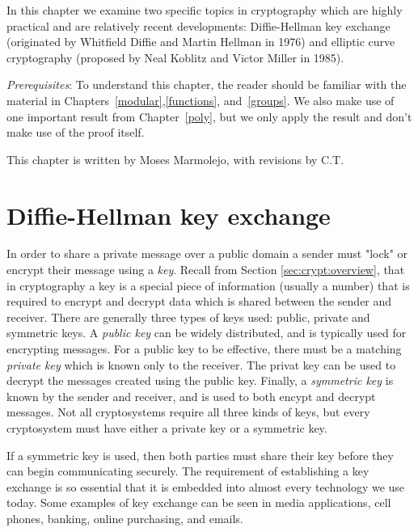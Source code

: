 
In this chapter we examine two specific topics in cryptography which are highly practical and are relatively recent developments: Diffie-Hellman key exchange (originated by Whitfield Diffie and Martin Hellman in 1976) and elliptic curve cryptography (proposed by Neal Koblitz and Victor Miller in 1985).
\medskip

\noindent
\emph{Prerequisites}: 
To understand this chapter, the reader should be familiar with the material in  Chapters~\ref{modular},\ref{functions}, and~\ref{groups}. We also make use of one important result from Chapter~\ref{poly}, but we only apply the result and don't make use of the proof itself.  
\bigskip

This chapter is written by Moses Marmolejo, with revisions by C.T.

\section{Diffie-Hellman key exchange}\label{sec:DHKE:1}

In order to share a private message over a public domain a sender must  "lock" or encrypt their message using a \emph{key}.  Recall from Section \ref{sec:crypt:overview}, that in cryptography a  key is a special piece of information (usually a number)  that is required to encrypt and decrypt data which is shared between the sender and receiver. There are generally three types of keys used: public, private and symmetric keys. A \emph{public key} can be widely distributed, and is typically used for encrypting messages.  For a public key to be effective, there must be a matching \emph{private key} which is known only to the receiver. The privat key can be used to decrypt the messages created using the public key.  Finally, a \emph{symmetric key} is known by the sender and receiver, and is used to both encypt and decrypt messages.  Not all cryptosystems require all three kinds of keys, but every cryptosystem must have either a private key or a symmetric key.

  If a symmetric key is used, then both parties must share their key before they can begin communicating securely. The requirement of establishing a key exchange is so essential that it is embedded into almost every technology we use today.  Some examples of key exchange can be seen in media applications, cell phones, banking, online purchasing, and emails.  

